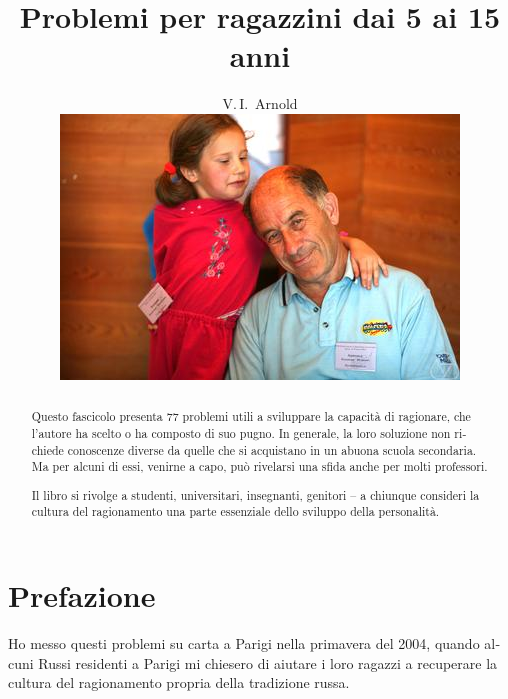 
\setdefaultlanguage[babelshorthands = false]{italian}

\title{Problemi per ragazzini dai 5 ai 15 anni}

\author{V.\,I.~Arnold
\vspace*{2cm}\\
\includegraphics[width=\linewidth]{resources/photo-arnold_small}
}
\date{}


\maketitle
\thispagestyle{empty}
\cleardoublepage
\setcounter{page}{1}
\begin{abstract}
Questo fascicolo presenta 77 problemi utili a sviluppare la capacità di ragionare, che l’autore ha scelto o ha composto di suo pugno. In generale, la loro soluzione non richiede conoscenze diverse da quelle che si acquistano in un abuona scuola secondaria. Ma per alcuni di essi, venirne a capo, può rivelarsi una sfida anche per molti professori.

Il libro si rivolge a studenti, universitari, insegnanti, genitori – a chiunque consideri la cultura del ragionamento una parte essenziale dello sviluppo della personalità.
\end{abstract}
\clearpage

\section*{Prefazione}
Ho messo questi problemi su carta a Parigi nella primavera del 2004, quando alcuni Russi residenti a Parigi mi chiesero di aiutare i loro ragazzi a recuperare la cultura del ragionamento propria della tradizione russa.

